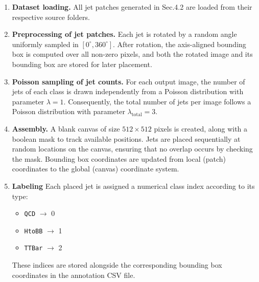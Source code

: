 \begin{enumerate}
    \item \textbf{Dataset loading.} All jet patches generated in Sec.4.2 are loaded from their respective source folders. 

    \item \textbf{Preprocessing of jet patches.} Each jet is rotated by a random angle uniformly sampled in $[0^\circ, 360^\circ]$. After rotation, the axis-aligned bounding box is computed over all non-zero pixels, and both the rotated image and its bounding box are stored for later placement.

    \item \textbf{Poisson sampling of jet counts.} For each output image, the number of jets of each class is drawn independently from a Poisson distribution with parameter $\lambda = 1$. Consequently, the total number of jets per image follows a Poisson distribution with parameter $\lambda_{\text{total}} = 3$.

    \item \textbf{Assembly.} A blank canvas of size $512 \times 512$ pixels is created, along with a boolean mask to track available positions. Jets are placed sequentially at random locations on the canvas, ensuring that no overlap occurs by checking the mask. Bounding box coordinates are updated from local (patch) coordinates to the global (canvas) coordinate system.

    \item \textbf{Labeling} Each placed jet is assigned a numerical class index according to its type:
    \begin{itemize}
        \item \texttt{QCD} $\rightarrow$ 0
        \item \texttt{HtoBB} $\rightarrow$ 1
        \item \texttt{TTBar} $\rightarrow$ 2
    \end{itemize}
    These indices are stored alongside the corresponding bounding box coordinates in the annotation CSV file.
\end{enumerate}

